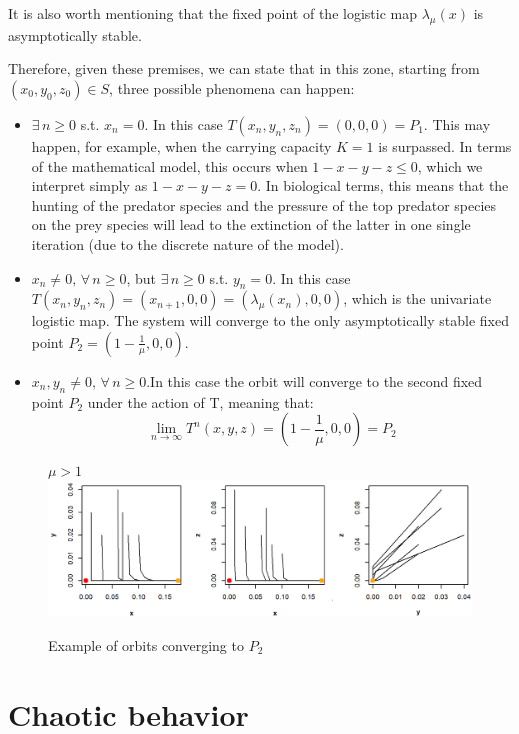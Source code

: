\documentclass[10pt]{Configuration_Files/PoliMi3i_thesis}
\begin{document}
It is also worth mentioning that the fixed point of the logistic map $\lambda_\mu(x)$ is asymptotically stable.

Therefore, given these premises, we can state that in this zone, starting from $(x_0, y_0, z_0)\in S$, three possible phenomena can happen:
\begin{itemize}
    \item $\exists \,  n\geq 0$ s.t. $x_n=0$. In this case $T(x_n,y_n,z_n)=(0,0,0) =  P_1$. This may happen, for example, when the carrying capacity $K=1$ is surpassed. In terms of the mathematical model, this occurs when $1-x-y-z\leq 0$, which we interpret simply as $1-x-y-z=0$. In biological terms, this means that the hunting of the predator species and the pressure of the top predator species on the prey species will lead to the extinction of the latter in one single iteration (due to the discrete nature of the model).  
    
    \item $x_n \neq 0, \, \forall \, n\geq0$, but $\exists \,  n\geq 0$ s.t. $y_n=0$. In this case $T(x_n,y_n,z_n)=(x_{n+1},0,0) = (\lambda_\mu(x_n),0,0)$, which is the univariate logistic map. The system will converge to the only asymptotically stable fixed point $P_2=(1 - \frac{1}{\mu},0,0)$. 

    \item $x_n,y_n \neq 0, \, \forall \, n\geq0$.In this case the orbit will converge to the second fixed point $P_2$ under the action of T, meaning that:
$$\lim_{n\to\infty} T^n(x,y,z) = (1 - \frac{1}{\mu},0,0) = P_2$$
\end{itemize}

\begin{figure}[!h]
\centering
 \textbf{\footnotesize{$\mu>1$}}   
    \includegraphics[width=1\linewidth]{images/Chapter 5/unnamed-chunk-5-1.png} 
    \caption{Example of orbits converging to $P_2$}
\end{figure}


\chapter{Chaotic behavior} 
\end{document}

